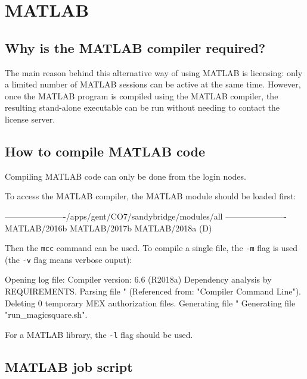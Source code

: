 \chapter{MATLAB}
\label{ch:matlab}

\section{Why is the MATLAB compiler required?}

The main reason behind this alternative way of using MATLAB is licensing: only
a limited number of MATLAB sessions can be active at the same time. However, once
the MATLAB program is compiled using the MATLAB compiler, the resulting stand-alone
executable can be run without needing to contact the license server.

\section{How to compile MATLAB code}

Compiling MATLAB code can only be done from the login nodes.

To access the MATLAB compiler, the MATLAB module should be loaded first:

\begin{prompt}
----------------------/apps/gent/CO7/sandybridge/modules/all ----------------------
   MATLAB/2016b    MATLAB/2017b    MATLAB/2018a (D)
\end{prompt}

Then the \verb|mcc| command can be used. To compile a single file, the \verb|-m|
flag is used (the \verb|-v| flag means verbose ouput):

\begin{prompt}
Opening log file:  %
Compiler version: 6.6 (R2018a)
Dependency analysis by REQUIREMENTS.
Parsing file "%
	(Referenced from: "Compiler Command Line").
Deleting 0 temporary MEX authorization files.
Generating file "%
Generating file "run\_magicsquare.sh".
\end{prompt}

For a MATLAB library, the \verb|-l| flag should be used.

\section{MATLAB job script}

